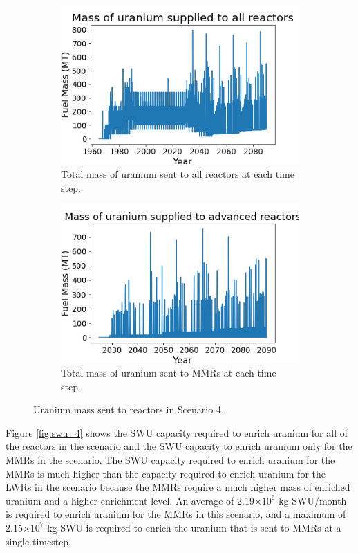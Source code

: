 \begin{figure}
    \centering
    \begin{subfigure}{0.4\textwidth}
        \centering
        \includegraphics[scale=0.3]{figures/fuelsupply_scenarios_4.png}
        \caption{Total mass of uranium sent to all reactors at each time step.}
        \label{fig:totalfuel_4}
    \end{subfigure}
    \begin{subfigure}{0.4\textwidth}
        \centering
        \includegraphics[scale=0.3]{figures/advancedRX_fuelsupply_scenarios_4.png}
        \caption{Total mass of uranium sent to \glspl{MMR} at each time step.}
        \label{fig:haleu_4}
    \end{subfigure}
    \caption{Uranium mass sent to reactors in Scenario 4.}
    \label{fig:fuel_4}
\end{figure}

Figure \ref{fig:swu_4} shows the \gls{SWU} capacity required to 
enrich uranium for all of the reactors in the scenario and the 
\gls{SWU} capacity to enrich uranium only for the \glspl{MMR} in 
the scenario. The \gls{SWU} capacity required to enrich uranium 
for the \glspl{MMR} is much higher than the capacity required to 
enrich uranium for the \glspl{LWR} in the scenario because
the \glspl{MMR} require a much higher mass of enriched uranium 
and a higher enrichment level. An average of 2.19$\times 10^6$ 
kg-\gls{SWU}/month is required to enrich uranium for the \glspl{MMR}
in this scenario, and a maximum of 2.15$\times 10^7$ kg-\gls{SWU}
is required to enrich the uranium that is sent to \glspl{MMR} at 
a single timestep. 

